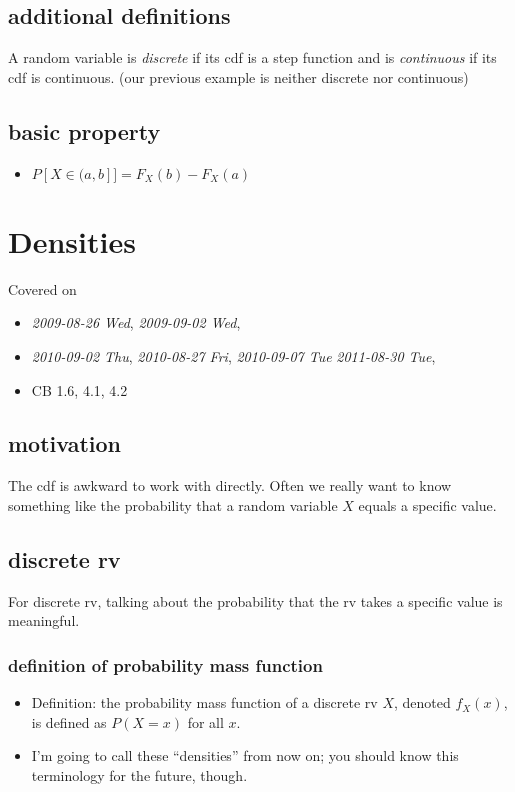 \documentclass[11pt]{article}
\begin{document}
\subsection{additional definitions}
\label{sec-2-3}

     A random variable is \emph{discrete} if its cdf is a step function and
     is \emph{continuous} if its cdf is continuous.  (our previous example is
     neither discrete nor continuous)
\subsection{basic property}
\label{sec-2-4}

\begin{itemize}
\item $P[X \in (a, b]] = F_X(b) - F_X(a)$
\end{itemize}
\section{Densities}
\label{sec-3}

    Covered on 
\begin{itemize}
\item \textit{2009-08-26 Wed}, \textit{2009-09-02 Wed},
\item \textit{2010-09-02 Thu}, \textit{2010-08-27 Fri}, \textit{2010-09-07 Tue}
      \textit{2011-08-30 Tue},
\item CB 1.6, 4.1, 4.2
\end{itemize}
\subsection{motivation}
\label{sec-3-1}

     The cdf is awkward to work with directly.  Often we really want to
     know something like the probability that a random variable $X$
     equals a specific value.
\subsection{discrete rv}
\label{sec-3-2}

     For discrete rv, talking about the probability that the rv takes a
     specific value is meaningful.
\subsubsection{definition of probability mass function}
\label{sec-3-2-1}

\begin{itemize}
\item Definition: the probability mass function of a discrete rv
        $X$, denoted $f_X(x)$, is defined as $P(X = x)$ for all $x$.
\item I'm going to call these ``densities'' from now on; you should know
        this terminology for the future, though.
\end{itemize}
\end{document}
